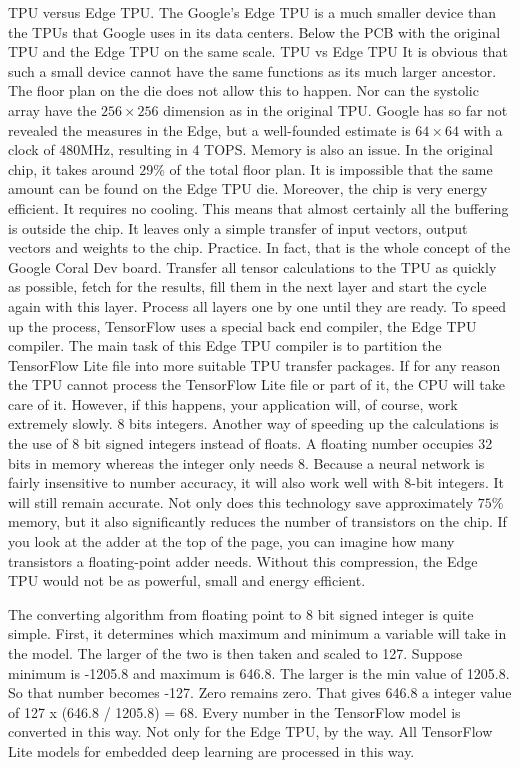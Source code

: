 TPU versus Edge TPU.
The Google's Edge TPU is a much smaller device than the TPUs that Google uses in its data centers. Below the PCB with the original TPU and the Edge TPU on the same scale.
TPU vs Edge TPU
It is obvious that such a small device cannot have the same functions as its much larger ancestor. The floor plan on the die does not allow this to happen. Nor can the systolic array have the $256 \times 256$ dimension as in the original TPU. Google has so far not revealed the measures in the Edge, but a well-founded estimate is $64 \times 64$ with a clock of $480 \si{\mega\hertz}$, resulting in 4 TOPS.
Memory is also an issue. In the original chip, it takes around $29\%$ of the total floor plan. It is impossible that the same amount can be found on the Edge TPU die. Moreover, the chip is very energy efficient. It requires no cooling. This means that almost certainly all the buffering is outside the chip. It leaves only a simple transfer of input vectors, output vectors and weights to the chip.  
Practice.
In fact, that is the whole concept of the Google Coral Dev board. Transfer all tensor calculations to the TPU as quickly as possible, fetch for the results, fill them in the next layer and start the cycle again with this layer. Process all layers one by one until they are ready.
To speed up the process, TensorFlow uses a special back end compiler, the Edge TPU compiler. The main task of this Edge TPU compiler is to partition the TensorFlow Lite file into more suitable TPU transfer packages. If for any reason the TPU cannot process the TensorFlow Lite file or part of it, the CPU will take care of it. However, if this happens, your application will, of course, work extremely slowly.
8 bits integers.
Another way of speeding up the calculations is the use of 8 bit signed integers instead of floats. A floating number occupies 32 bits in memory whereas the integer only needs 8. Because a neural network is fairly insensitive to number accuracy, it will also work well with 8-bit integers. It will still remain accurate. Not only does this technology save approximately $75\%$ memory, but it also significantly reduces the number of transistors on the chip. If you look at the adder at the top of the page, you can imagine how many transistors a floating-point adder needs. Without this compression, the Edge TPU would not be as powerful, small and energy efficient.

The converting algorithm from floating point to 8 bit signed integer is quite simple. First, it determines which maximum and minimum a variable will take in the model. The larger of the two is then taken and scaled to 127. Suppose minimum is -1205.8 and maximum is 646.8. The larger is the min value of 1205.8. So that number becomes -127. Zero remains zero. That gives 646.8 a integer value of 127 x (646.8 / 1205.8)  = 68. Every number in the TensorFlow model is converted in this way. Not only for the Edge TPU, by the way. All TensorFlow Lite models for embedded deep learning are processed in this way.

